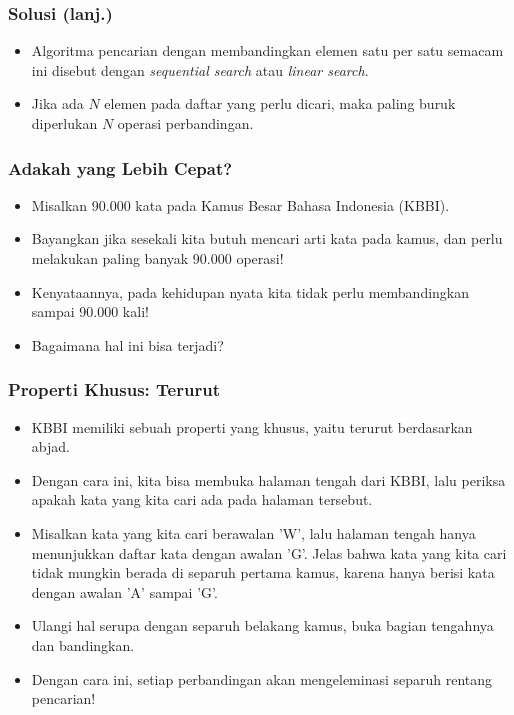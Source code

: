 \documentclass{beamer}
\begin{document}
\begin{frame}
\frametitle{Solusi (lanj.)}
\begin{itemize}
	\item Algoritma pencarian dengan membandingkan elemen satu per satu semacam ini disebut dengan \alert{\textit{sequential search}} atau \alert{\textit{linear search}}.
	\item Jika ada $N$ elemen pada daftar yang perlu dicari, maka paling buruk diperlukan $N$ operasi perbandingan.
\end{itemize}
\end{frame}

\begin{frame}
\frametitle{Adakah yang Lebih Cepat?}
\begin{itemize}
	\item Misalkan 90.000 kata pada Kamus Besar Bahasa Indonesia (KBBI).
	\item Bayangkan jika sesekali kita butuh mencari arti kata pada kamus, dan perlu melakukan paling banyak 90.000 operasi!
	\item Kenyataannya, pada kehidupan nyata kita tidak perlu membandingkan sampai 90.000 kali!
	\item Bagaimana hal ini bisa terjadi?
\end{itemize}
\end{frame}

\begin{frame}
\frametitle{Properti Khusus: Terurut}
\begin{itemize}
	\item KBBI memiliki sebuah properti yang khusus, yaitu \alert{terurut berdasarkan abjad}.
	\item Dengan cara ini, kita bisa membuka halaman tengah dari KBBI, lalu periksa apakah kata yang kita cari ada pada halaman tersebut.
	\item Misalkan kata yang kita cari berawalan 'W', lalu halaman tengah hanya menunjukkan daftar kata dengan awalan 'G'. Jelas bahwa kata yang kita cari tidak mungkin berada di \alert{separuh pertama} kamus, karena hanya berisi kata dengan awalan 'A' sampai 'G'.
	\item Ulangi hal serupa dengan separuh belakang kamus, buka bagian tengahnya dan bandingkan.
	\item Dengan cara ini, setiap perbandingan akan mengeleminasi separuh rentang pencarian!
\end{itemize}
\end{frame}
\end{document}
